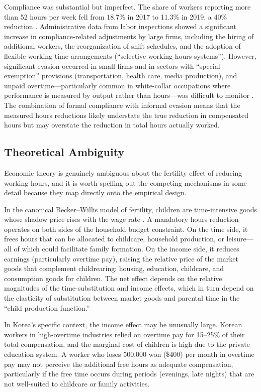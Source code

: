 \documentclass[12pt]{article}
\begin{document}
Compliance was substantial but imperfect. The share of workers reporting more than 52 hours per week fell from 18.7\% in 2017 to 11.3\% in 2019, a 40\% reduction \citep{kli2020workhours}. Administrative data from labor inspections showed a significant increase in compliance-related adjustments by large firms, including the hiring of additional workers, the reorganization of shift schedules, and the adoption of flexible working time arrangements (``selective working hours systems''). However, significant evasion occurred in small firms and in sectors with ``special exemption'' provisions (transportation, health care, media production), and unpaid overtime---particularly common in white-collar occupations where performance is measured by output rather than hours---was difficult to monitor \citep{lee2020enforcement}. The combination of formal compliance with informal evasion means that the measured hours reductions likely understate the true reduction in compensated hours but may overstate the reduction in total hours actually worked.

\subsection{Theoretical Ambiguity}

Economic theory is genuinely ambiguous about the fertility effect of reducing working hours, and it is worth spelling out the competing mechanisms in some detail because they map directly onto the empirical design.

In the canonical Becker--Willis model of fertility, children are time-intensive goods whose shadow price rises with the wage rate \citep{becker1960economic, becker1991treatise, willis1973new}. A mandatory hours reduction operates on both sides of the household budget constraint. On the time side, it frees hours that can be allocated to childcare, household production, or leisure---all of which could facilitate family formation. On the income side, it reduces earnings (particularly overtime pay), raising the relative price of the market goods that complement childrearing: housing, education, childcare, and consumption goods for children. The net effect depends on the relative magnitudes of the time-substitution and income effects, which in turn depend on the elasticity of substitution between market goods and parental time in the ``child production function.''

In Korea's specific context, the income effect may be unusually large. Korean workers in high-overtime industries relied on overtime pay for 15--25\% of their total compensation, and the marginal cost of children is high due to the private education system. A worker who loses 500,000 won (\$400) per month in overtime pay may not perceive the additional free hours as adequate compensation, particularly if the free time occurs during periods (evenings, late nights) that are not well-suited to childcare or family activities.
\end{document}
